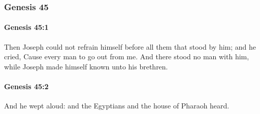 	\subsubsection{Genesis 45} %
		\label{GENESIS-45}

		\paragraph{Genesis 45:1} %
			\label{GENESIS-45-1}

			Then Joseph could not refrain himself before all them that stood by him; and he cried, Cause every man to go out from me. And there stood no man with him, while Joseph made himself known unto his brethren.


		\paragraph{Genesis 45:2} %
			\label{GENESIS-45-2}

			And he wept aloud: and the Egyptians and the house of Pharaoh heard.

